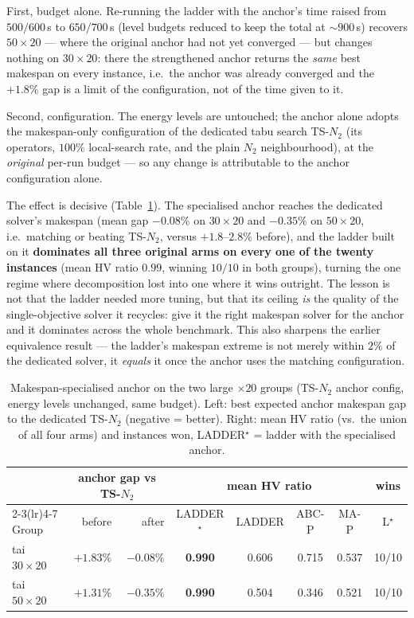 \documentclass[preprint,12pt]{elsarticle}
\begin{document}
First, budget alone. Re-running the ladder with the anchor's time raised
from $500/600$\,s to $650/700$\,s (level budgets reduced to keep the total
at ${\sim}900$\,s) recovers $50{\times}20$ --- where the original anchor had
not yet converged --- but changes nothing on $30{\times}20$: there the
strengthened anchor returns the \emph{same} best makespan on every instance,
i.e.\ the anchor was already converged and the $+1.8\%$ gap is a limit of
the configuration, not of the time given to it.

Second, configuration. The energy levels are untouched; the anchor alone
adopts the makespan-only configuration of the dedicated tabu search
TS-$N_2$ \cite{DiazTabu2026} (its operators, $100\%$ local-search rate, and
the plain $N_2$ neighbourhood), at the \emph{original} per-run budget ---
so any change is attributable to the anchor configuration alone.

The effect is decisive (Table~\ref{tab:anchor}). The specialised anchor
reaches the dedicated solver's makespan (mean gap $-0.08\%$ on $30{\times}20$
and $-0.35\%$ on $50{\times}20$, i.e.\ matching or beating TS-$N_2$, versus
$+1.8$--$2.8\%$ before), and the ladder built on it \textbf{dominates all
three original arms on every one of the twenty instances} (mean HV ratio
$0.99$, winning $10/10$ in both groups), turning the one regime where
decomposition lost into one where it wins outright. The lesson is not that
the ladder needed more tuning, but that its ceiling \emph{is} the quality of
the single-objective solver it recycles: give it the right makespan solver
for the anchor and it dominates across the whole benchmark. This also
sharpens the earlier equivalence result --- the ladder's makespan extreme is
not merely within $2\%$ of the dedicated solver, it \emph{equals} it once the
anchor uses the matching configuration.

\begin{table}[htb]
\centering\small
\caption{Makespan-specialised anchor on the two large $\times 20$ groups
(TS-$N_2$ anchor config, energy levels unchanged, same budget). Left:
best expected anchor makespan gap to the dedicated TS-$N_2$ (negative =
better). Right: mean HV ratio (vs.\ the union of all four arms) and
instances won, LADDER$^\star$ = ladder with the specialised anchor.}
\label{tab:anchor}
\begin{tabular}{l r r | cccc c}
\toprule
 & \multicolumn{2}{c}{anchor gap vs TS-$N_2$} & \multicolumn{4}{c}{mean HV ratio} & wins \\
\cmidrule(lr){2-3}\cmidrule(lr){4-7}
Group & before & after & LADDER$^\star$ & LADDER & ABC-P & MA-P & L$^\star$ \\
\midrule
tai $30{\times}20$ & $+1.83\%$ & $-0.08\%$ & \textbf{0.990} & 0.606 & 0.715 & 0.537 & 10/10 \\
tai $50{\times}20$ & $+1.31\%$ & $-0.35\%$ & \textbf{0.990} & 0.504 & 0.346 & 0.521 & 10/10 \\
\bottomrule
\end{tabular}
\end{table}
\end{document}
